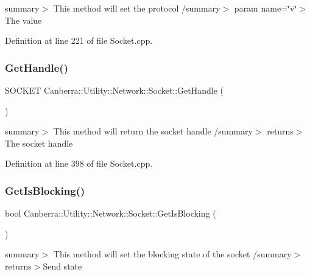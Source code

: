 summary$>$ This method will set the protocol /summary$>$ param name=\char`\"{}v\char`\"{}$>$The value

Definition at line 221 of file Socket.\+cpp.

\mbox{\label{class_canberra_1_1_utility_1_1_network_1_1_socket_adbd5500b2d1193695b5f537f913601e4_adbd5500b2d1193695b5f537f913601e4}} 
\subsubsection{\texorpdfstring{Get\+Handle()}{GetHandle()}}
{\footnotesize\ttfamily S\+O\+C\+K\+ET Canberra\+::\+Utility\+::\+Network\+::\+Socket\+::\+Get\+Handle (\begin{DoxyParamCaption}{ }\end{DoxyParamCaption})}

summary$>$ This method will return the socket handle /summary$>$ returns$>$The socket handle

Definition at line 398 of file Socket.\+cpp.

\mbox{\label{class_canberra_1_1_utility_1_1_network_1_1_socket_a2a09b5340ebe47c2f94331d181697be2_a2a09b5340ebe47c2f94331d181697be2}} 
\subsubsection{\texorpdfstring{Get\+Is\+Blocking()}{GetIsBlocking()}}
{\footnotesize\ttfamily bool Canberra\+::\+Utility\+::\+Network\+::\+Socket\+::\+Get\+Is\+Blocking (\begin{DoxyParamCaption}{ }\end{DoxyParamCaption})}

summary$>$ This method will set the blocking state of the socket /summary$>$ returns$>$Send state

